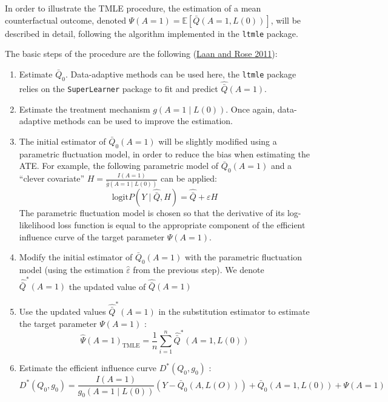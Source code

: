 \documentclass[
]{book}
\begin{document}
In order to illustrate the TMLE procedure, the estimation of a mean counterfactual outcome, denoted \(\Psi(A=1) = \mathbb{E} \left[\bar{Q}(A=1,L(0))\right]\), will be described in detail, following the algorithm implemented in the \texttt{ltmle} package.

The basic steps of the procedure are the following (\protect\hyperlink{ref-vanderlaan_book2011}{Laan and Rose 2011}):

\begin{enumerate}
\def\labelenumi{\arabic{enumi}.}
\item
  Estimate \(\bar{Q}_0\). Data-adaptive methods can be used here, the \texttt{ltmle} package relies on the \texttt{SuperLearner} package to fit and predict \(\hat{\bar{Q}}(A=1)\).
\item
  Estimate the treatment mechanism \(g(A=1 \mid L(0))\). Once again, data-adaptive methods can be used to improve the estimation.
\item
  The initial estimator of \(\bar{Q}_0(A=1)\) will be slightly modified using a parametric fluctuation model, in order to reduce the bias when estimating the ATE. For example, the following parametric model of \(\bar{Q}_0(A=1)\) and a ``clever covariate'' \(H = \frac{I(A=1)}{\hat{g}(A=1 \mid L(0))}\) can be applied:
  \begin{equation*}
   \text{logit} P(Y \mid \hat{\bar{Q}}, H) = \hat{\bar{Q}} + \varepsilon H
  \end{equation*}
  The parametric fluctuation model is chosen so that the derivative of its log-likelihood loss function is equal to the appropriate component of the efficient influence curve of the target parameter \(\Psi(A=1)\).
\item
  Modify the initial estimator of \(\bar{Q}_0(A=1)\) with the parametric fluctuation model (using the estimation \(\hat{\varepsilon}\) from the previous step). We denote \(\hat{\bar{Q}}^*(A=1)\) the updated value of \(\hat{\bar{Q}}(A=1)\)
\item
  Use the updated values \(\hat{\bar{Q}}^*(A=1)\) in the substitution estimator to estimate the target parameter \(\Psi(A=1)\) :
  \begin{equation*}
  \hat{\Psi}(A=1)_\text{TMLE} = \frac{1}{n} \sum_{i=1}^n \hat{\bar{Q}}^* (A=1,L(0)) 
  \end{equation*}
\item
  Estimate the efficient influence curve \(D^*(Q_0,g_0)\) :
  \begin{equation*}
  D^*(Q_0,g_0) = \frac{I(A=1)}{g_0(A=1 \mid L(0))}(Y - \bar{Q}_0(A,L(O))) + \bar{Q}_0(A=1,L(0))  + \Psi(A=1)
  \end{equation*}
\end{enumerate}
\end{document}
